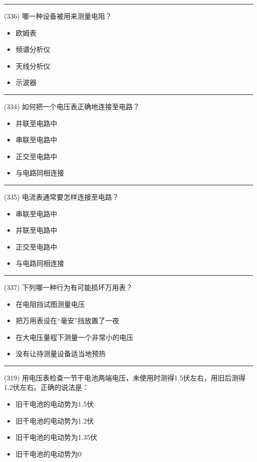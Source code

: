 \documentclass[twocolumn,hyperref,UTF8]{ctexart}  %
\begin{document}
\noindent\rule{0.5\textwidth}{1pt}
\heiti (336) 哪一种设备被用来测量电阻？ \songti {\color{gray} [LK1194] }
\begin{itemize}
	\item  欧姆表
	\item  频谱分析仪
	\item  天线分析仪
	\item  示波器
\end{itemize}


\noindent\rule{0.5\textwidth}{1pt}
\heiti (334) 如何把一个电压表正确地连接至电路？ \songti {\color{gray} [LK1192] }
\begin{itemize}
	\item  并联至电路中
	\item  串联至电路中
	\item  正交至电路中
	\item  与电路同相连接
\end{itemize}


\noindent\rule{0.5\textwidth}{1pt}
\heiti (335) 电流表通常要怎样连接至电路？ \songti {\color{gray} [LK1193] }
\begin{itemize}
	\item  串联至电路中
	\item  并联至电路中
	\item  正交至电路中
	\item  与电路同相连接
\end{itemize}


\noindent\rule{0.5\textwidth}{1pt}
\heiti (337) 下列哪一种行为有可能损坏万用表？ \songti {\color{gray} [LK1195] }
\begin{itemize}
	\item  在电阻挡试图测量电压
	\item  把万用表设在“毫安”挡放置了一夜
	\item  在大电压量程下测量一个非常小的电压
	\item  没有让待测量设备适当地预热
\end{itemize}


\noindent\rule{0.5\textwidth}{1pt}
\heiti (319) 用电压表检查一节干电池两端电压，未使用时测得1.5伏左右，用旧后测得1.2伏左右。正确的说法是： \songti {\color{gray} [LK0436] }
\begin{itemize}
	\item  旧干电池的电动势为1.5伏
	\item  旧干电池的电动势为1.2伏
	\item  旧干电池的电动势为1.35伏
	\item  旧干电池的电动势为0
\end{itemize}
\end{document}

